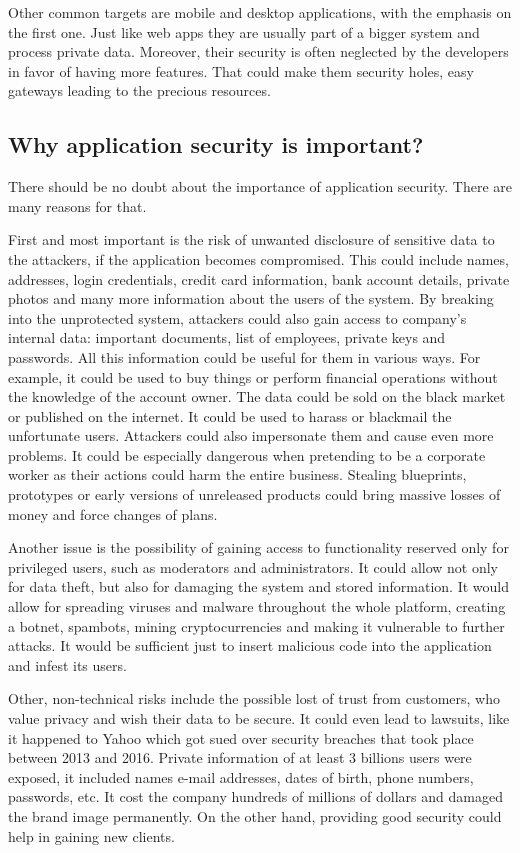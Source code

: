 \documentclass[a4paper]{article}
\begin{document}
Other common targets are mobile and desktop applications, with the emphasis on
the first one. Just like web apps they are usually part of a bigger system and
process private data. Moreover, their security is often neglected by the
developers in favor of having more features. That could make them security
holes, easy gateways leading to the precious resources. 

\newpage

\subsection{Why application security is important?}

There should be no doubt about the importance of application security. There are
many reasons for that.

First and most important is the risk of unwanted disclosure of sensitive data to
the attackers, if the application becomes compromised. This could include names,
addresses, login credentials, credit card information, bank account details,
private photos and many more information about the users of the system. By
breaking into the unprotected system, attackers could also gain access to
company's internal data: important documents, list of employees, private keys
and passwords. All this information could be useful for them in various ways.
For example, it could be used to buy things or perform financial operations
without the knowledge of the account owner. The data could be sold on the black
market or published on the internet. It could be used to harass or blackmail the
unfortunate users. Attackers could also impersonate them and cause even more
problems. It could be especially dangerous when pretending to be a corporate
worker as their actions could harm the entire business. Stealing blueprints,
prototypes or early versions of unreleased products could bring massive
losses of money and force changes of plans.

Another issue is the possibility of gaining access to functionality reserved
only for privileged users, such as moderators and administrators. It could allow
not only for data theft, but also for damaging the system and stored
information. It would allow for spreading viruses and malware throughout the
whole platform, creating a botnet, spambots, mining cryptocurrencies and making
it vulnerable to further attacks. It would be sufficient just to insert
malicious code into the application and infest its users.

Other, non-technical risks include the possible lost of trust from customers,
who value privacy and wish their data to be secure. It could even lead to
lawsuits, like it happened to Yahoo which got sued over security breaches that 
took place between 2013 and 2016. Private information of at least 3 billions 
users were exposed, it included names e-mail addresses, dates of birth,
phone numbers, passwords, etc. It cost the company hundreds of millions of
dollars and damaged the brand image permanently. On the other hand, providing
good security could help in gaining new clients.
\end{document}
